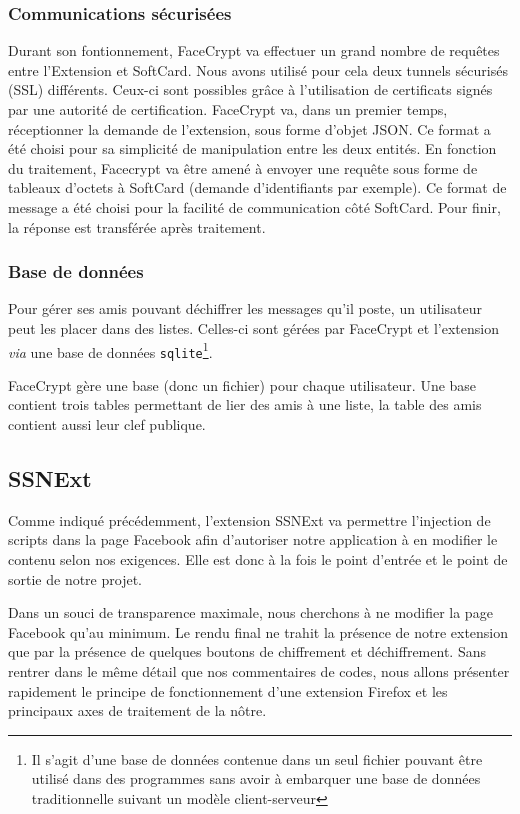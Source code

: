 \documentclass[a4paper,11pt,french]{article}
\begin{document}
\subsubsection{Communications sécurisées}
Durant son fontionnement, FaceCrypt va effectuer un grand nombre de requêtes
entre l'Extension et SoftCard. Nous avons utilisé pour cela deux tunnels
sécurisés (SSL) différents. Ceux-ci sont possibles grâce à l'utilisation de
certificats signés par une autorité de certification. FaceCrypt
va, dans un premier temps, réceptionner la demande de l'extension, sous forme
d'objet JSON. Ce format a été choisi pour sa simplicité de manipulation entre
les deux entités. En fonction du traitement, Facecrypt va être amené à envoyer
une requête sous forme de tableaux d'octets à SoftCard (demande d'identifiants
par exemple). Ce format de message a été choisi pour la facilité de 
communication côté SoftCard. Pour finir, la réponse est transférée après
traitement.

\subsubsection{Base de données}
Pour gérer ses amis pouvant déchiffrer les messages qu'il poste, un utilisateur
peut les placer dans des listes. Celles-ci sont gérées par FaceCrypt et 
l'extension \emph{via} une base de données \texttt{sqlite}\footnote{Il s'agit
d'une base de données contenue dans un seul fichier pouvant être utilisé dans 
des programmes sans avoir à embarquer une base de données traditionnelle suivant
un modèle client-serveur}. 

FaceCrypt gère une base (donc un fichier) pour chaque utilisateur. Une base 
contient trois tables permettant de lier des amis à une liste, la table des 
amis contient aussi leur clef publique.

\subsection{SSNExt} 
Comme indiqué précédemment, l'extension SSNExt va permettre l'injection de 
scripts dans la page Facebook afin d'autoriser notre application à en modifier 
le contenu selon nos exigences. Elle est donc à la fois le point d'entrée et 
le point de sortie de notre projet. 

Dans un souci de transparence maximale, nous cherchons à ne modifier la page 
Facebook qu'au minimum. Le rendu final ne trahit la présence de notre extension 
que par la présence de quelques boutons de chiffrement et déchiffrement. Sans 
rentrer dans le même détail que nos commentaires de codes, nous allons présenter 
rapidement le principe de fonctionnement d'une extension Firefox et les principaux 
axes de traitement de la nôtre.
\end{document}
